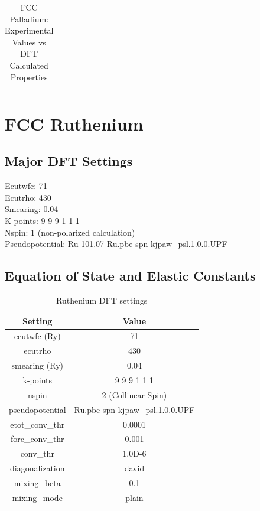 \begin{table}[ht]
\begin{tabular}{lll}
\hline\hline
\end{tabular}
\caption{FCC Palladium: Experimental Values vs DFT Calculated Properties}
\label{table:pdexperimentaldft}
\end{table}




\clearpage
\FloatBarrier
\section{FCC Ruthenium}

\FloatBarrier
\subsection{Major DFT Settings}

Ecutwfc: 71 \\
Ecutrho: 430 \\
Smearing: 0.04 \\
K-points: 9 9 9 1 1 1 \\
Nspin: 1  (non-polarized calculation) \\
Pseudopotential: Ru 101.07 Ru.pbe-spn-kjpaw\_psl.1.0.0.UPF   \\






\FloatBarrier
\subsection{Equation of State and Elastic Constants}

\begin{table}[h]
\begin{center}
\renewcommand{\arraystretch}{1.2}
\begin{tabular}{c c}
\hline\hline
Setting & Value \\
\hline\hline
ecutwfc (Ry) & 71 \\
ecutrho & 430 \\
smearing (Ry) & 0.04 \\
k-points &  9 9 9 1 1 1   \\
nspin & 2 (Collinear Spin)   \\
pseudopotential &   Ru.pbe-spn-kjpaw\_psl.1.0.0.UPF   \\
etot\_conv\_thr & 0.0001 \\
forc\_conv\_thr & 0.001 \\ 
conv\_thr & 1.0D-6 \\ 
diagonalization & david \\ 
mixing\_beta & 0.1 \\ 
mixing\_mode & plain \\ 
\hline\hline
\end{tabular}
\end{center}
\caption{Ruthenium DFT settings}
\label{table:rufccdftsettings}
\end{table}

